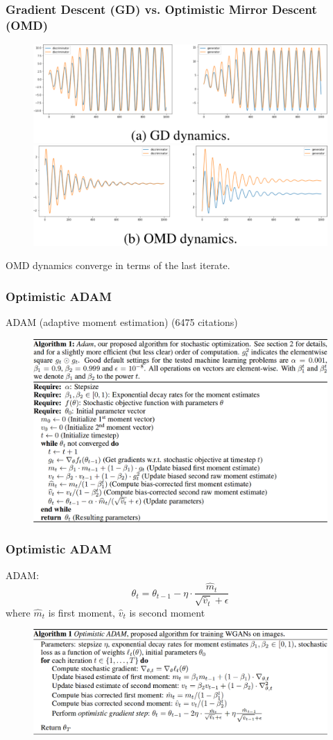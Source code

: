 \documentclass{beamer}
\begin{document}
\begin{frame}
\frametitle{\small{Gradient Descent (GD) vs. Optimistic Mirror Descent (OMD)}}
\begin{figure}
  \includegraphics[width=.75\textwidth]{GD.png} \\
  \includegraphics[width=.75\textwidth]{OMD.png}
\end{figure}
OMD dynamics converge in terms of the last iterate.
\end{frame}

\begin{frame}
\frametitle{Optimistic ADAM}
ADAM (adaptive moment estimation) \cite{Kingma2014} (6475 citations)
\begin{figure}
  \includegraphics[width=.9\textwidth]{Adam.png}
\end{figure}
\end{frame}

\begin{frame}
\frametitle{Optimistic ADAM}
ADAM:
$$\theta_t = \theta_{t-1} - \eta \cdot \frac{\hat{m}_t}{\sqrt{\hat{v}_t} + \epsilon}$$
where $\hat{m}_t$ is first moment, $\hat{v}_t$ is second moment
\begin{figure}
  \includegraphics[width=\textwidth]{OptimisticADAM.png}
\end{figure}
\end{frame}
\end{document}
